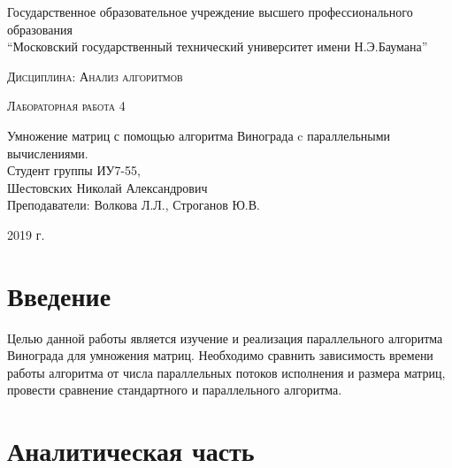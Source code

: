 \documentclass[a4paper, 14pt]{article}
\begin{document}
    \begin{titlepage}

        \begin{center}
            \large
            Государственное образовательное учреждение высшего профессионального образования\\
            “Московский государственный технический университет имени Н.Э.Баумана”
            \vspace{3cm}
            
            \textsc{Дисциплина: Анализ алгоритмов}
            \vspace{0.5cm}
                
            \textsc{Лабораторная работа 4}
            \vspace{1.5cm}
            
            {\LARGE Умножение матриц с помощью алгоритма Винограда c параллельными вычислениями.\\}
            \vspace{1.5cm}
            Студент группы ИУ7-55,\\   
            Шестовских Николай Александрович\\
            Преподаватели: Волкова Л.Л., Строганов Ю.В.
            \vfill
            
            2019 г.
            
            \end{center}

    \end{titlepage}
    \setcounter{page}{2}
\tableofcontents
	
	\newpage
	
        \section*{Введение}
        
        
        \parindent=1cm
        
        
        Целью данной работы является изучение и реализация параллельного алгоритма Винограда для умножения матриц. Необходимо сравнить зависимость времени работы алгоритма от числа параллельных потоков исполнения и размера матриц, провести сравнение стандартного и параллельного
алгоритма.
        

        \label{sec:intro}

    	\newpage
        \section{Аналитическая часть}
		\parindent=1cm
		
\end{document}
